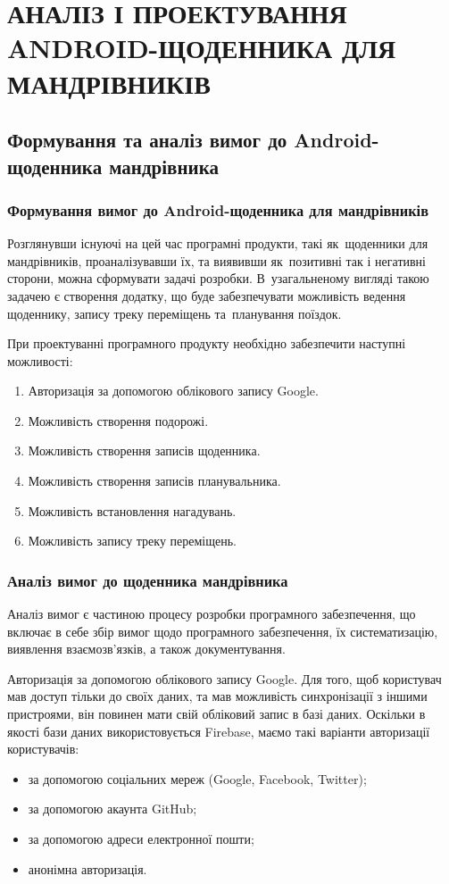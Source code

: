 \documentclass[../main.tex]{subfiles}
\begin{document}
\chapter{АНАЛІЗ І ПРОЕКТУВАННЯ ANDROID-ЩОДЕННИКА ДЛЯ МАНДРІВНИКІВ}

\section{Формування та аналіз вимог до Android-щоденника мандрівника}

\subsection{Формування вимог до Android-щоденника для мандрівників}

Розглянувши існуючі на цей час програмні продукти, такі як~щоденники для мандрівників, проаналізувавши їх, та виявивши як~позитивні так і негативні сторони, можна сформувати задачі розробки. В~узагальненому вигляді такою задачею є створення додатку, що буде забезпечувати можливість ведення щоденнику, запису треку переміщень та~планування поїздок.

При проектуванні програмного продукту необхідно забезпечити наступні можливості:
\begin{enumerate}
	\item Авторизація за допомогою облікового запису Google.
	\item Можливість створення подорожі.
	\item Можливість створення записів щоденника.
	\item Можливість створення записів планувальника.
	\item Можливість встановлення нагадувань.
	\item Можливість запису треку переміщень.
\end{enumerate}

\subsection{Аналіз вимог до щоденника мандрівника}

Аналіз вимог є частиною процесу розробки програмного забезпечення, що включає в себе збір вимог щодо програмного забезпечення, їх систематизацію, виявлення взаємозв'язків, а також документування.

Авторизація за допомогою облікового запису Google.
Для того, щоб користувач мав доступ тільки до своїх даних, та мав можливість синхронізації з іншими пристроями, він повинен мати свій обліковий запис в базі даних. Оскільки в якості бази даних використовується Firebase, маємо такі варіанти авторизації користувачів: 
\begin{itemize}[label={--}]
	\item за допомогою соціальних мереж (Google, Facebook, Twitter);
	\item за допомогою акаунта GitHub;
	\item за допомогою адреси електронної пошти;
	\item анонімна авторизація.
\end{itemize}
\end{document}

